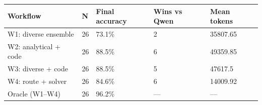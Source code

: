 \begin{tabular}{lllll}
\hline
Workflow & N & Final accuracy & Wins vs Qwen & Mean tokens \\
\hline
W1: diverse ensemble & 26 & 73.1\% & 2 & 35807.65 \\
W2: analytical + code & 26 & 88.5\% & 6 & 49359.85 \\
W3: diverse + code & 26 & 88.5\% & 5 & 47617.5 \\
W4: route + solver & 26 & 84.6\% & 6 & 14009.92 \\
Oracle (W1–W4) & 26 & 96.2\% & — & — \\
\hline
\end{tabular}
